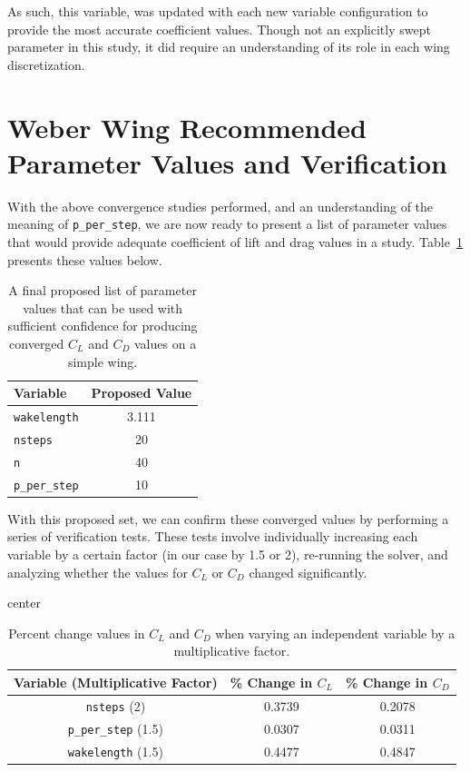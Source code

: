 \documentclass{report}
\begin{document}
As such, this variable, was updated with each new variable configuration to provide the most accurate coefficient values.
Though not an explicitly swept parameter in this study, it did require an understanding of its role in each wing discretization.

\section{Weber Wing Recommended Parameter Values and Verification}\label{wing_verification}

With the above convergence studies performed, and an understanding of the meaning of \texttt{p\_per\_step}, we are now ready to present a list of parameter values that would provide adequate coefficient of lift and drag values in a study.
Table~\ref{tab:proposed} presents these values below.



\begin{table}[H]
    \centering
    \caption{A final proposed list of parameter values that can be used with sufficient confidence for producing converged \texorpdfstring{$C_L$}{CL} and \texorpdfstring{$C_D$}{CD} values on a simple wing.}\label{tab:proposed}
    \begin{tabular}{l c}
        \toprule
        \textbf{Variable} & \textbf{Proposed Value} \\
        \midrule
        \texttt{wakelength} & 3.111 \\
        \texttt{nsteps} & 20 \\
        \texttt{n} & 40 \\
        \texttt{p\_per\_step} & 10 \\
        \bottomrule
    \end{tabular}
\end{table}


With this proposed set, we can confirm these converged values by performing a series of verification tests.
These tests involve individually increasing each variable by a certain factor (in our case by 1.5 or 2), re-running the solver, and analyzing whether the values for $C_L$ or $C_D$ changed significantly.


\begin{table}[H]
    \centering
    \caption{Percent change values in \texorpdfstring{$C_L$}{CL} and \texorpdfstring{$C_D$}{CD} when varying an independent variable by a multiplicative factor.}\label{tab:verification}
    \begin{adjustbox}{center}
    \begin{tabular}{c c c}
        \toprule
        \textbf{Variable (Multiplicative Factor)} & \textbf{\% Change in $C_L$} & \textbf{\% Change in $C_D$}\\
        \midrule
        \texttt{nsteps} (2) & 0.3739 & 0.2078 \\
        \texttt{p\_per\_step} (1.5) & 0.0307 & 0.0311 \\
        \texttt{wakelength} (1.5) & 0.4477 & 0.4847 \\
        \bottomrule
    \end{tabular}
    \end{adjustbox}
\end{table}
\end{document}
